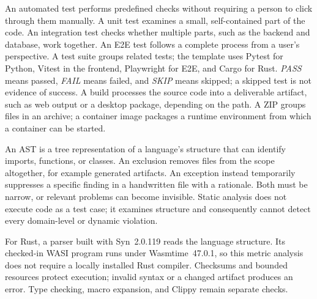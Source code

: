 \begin{beginnerstatement}

An automated test performs predefined checks without requiring a person to
click through them manually. A unit test examines a small, self-contained part
of the code. An integration test checks whether multiple parts, such as the
backend and database, work together. An E2E test follows a complete process
from a user's perspective. A test suite groups related tests; the template
uses Pytest for Python, Vitest in the frontend, Playwright for E2E, and Cargo
for Rust. \emph{PASS} means passed, \emph{FAIL} means failed, and \emph{SKIP}
means skipped; a skipped test is not evidence of success. A build processes
the source code into a deliverable artifact, such as web output or a desktop
package, depending on the path. A ZIP groups files in an archive; a container
image packages a runtime environment from which a container can be started.

An AST is a tree representation of a language's structure that can identify
imports, functions, or classes. An exclusion removes files from the scope
altogether, for example generated artifacts. An exception instead temporarily
suppresses a specific finding in a handwritten file with a rationale. Both
must be narrow, or relevant problems can become invisible. Static analysis
does not execute code as a test case; it examines structure and consequently
cannot detect every domain-level or dynamic violation.

For Rust, a parser built with Syn~2.0.119 reads the language structure. Its
checked-in WASI program runs under Wasmtime~47.0.1, so this metric analysis does
not require a locally installed Rust compiler. Checksums and bounded resources
protect execution; invalid syntax or a changed artifact produces an error.
Type checking, macro expansion, and Clippy remain separate checks.

\end{beginnerstatement}
